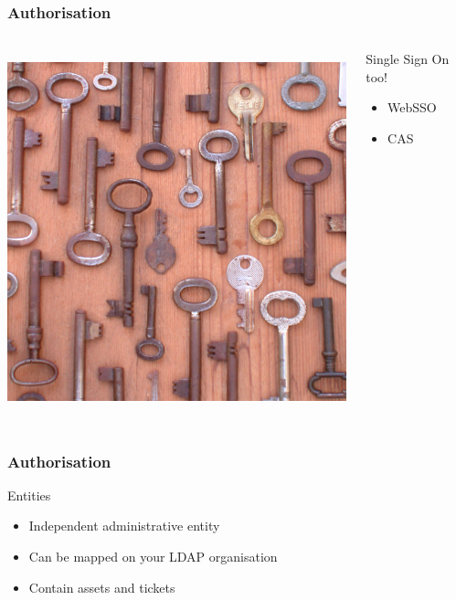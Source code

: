 \documentclass{beamer}
\begin{document}
\begin{frame}
    \frametitle{Authorisation}


 \begin{columns}
 \begin{column}{0.34\textwidth}
    \includegraphics[height=10.5cm]{pics/sso.jpg}
 \end{column}
 \begin{column}{0.90\textwidth}
    \begin{block}{Single Sign On too!}
        \begin{itemize}
            \item WebSSO
            \item CAS
        \end{itemize}
    \end{block}
 \end{column}
\end{columns}

\end{frame}




\begin{frame}
\frametitle{Authorisation}
    \begin{block}{Entities}
        \begin{itemize}
            \item Independent administrative entity
            \item Can be mapped on your LDAP organisation
            \item Contain assets and tickets
        \end{itemize}

    \end{block}
\end{frame}
\end{document}
